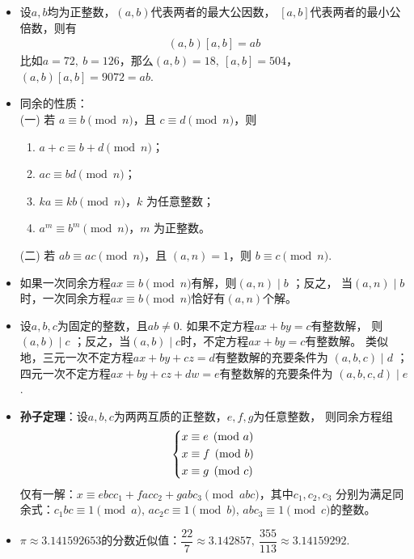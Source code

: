 \begin{itemize}[leftmargin=\inteval{\myitemleftmargin}pt,itemsep=
   \inteval{\myitemitempsep}pt,topsep=\inteval{\myitemtopsep}pt]
\item 设$a,b$均为正整数，$(a,b)$代表两者的最大公因数，
$[a,b]$代表两者的最小公倍数，则有
\begin{gather*}
    (a,b)[a,b]=ab
\end{gather*}
比如$a=72,\ b=126$，那么$(a,b)=18,\ [a,b]=504$，
$(a,b)[a,b]=9072=ab$. 

\item 同余的性质：\\
(一) 若 $ a \equiv b \pmod{n} $，且 $ c \equiv d \pmod{n} $，则
\vspace{-3mm}
\begin{enumerate}[label=(\arabic*)]
    \item $ a + c \equiv b + d \pmod{n} $； 
    \item $ ac \equiv bd \pmod{n} $；  
    \item $ ka \equiv kb \pmod{n} $，$ k $ 为任意整数；   
    \item $ a^m \equiv b^m \pmod{n} $，$ m $ 为正整数。
\end{enumerate}  
\vspace{-3mm}
(二) 若 $ ab \equiv ac \pmod{n} $，且 $ (a, n) = 1 $，则 $ b \equiv c \pmod{n} $.

\item 如果一次同余方程$ax\equiv b \pmod{n}$有解，则$(a,n)\mid b$ ；反之，
当$(a,n)\mid b$时，一次同余方程$ax\equiv b \pmod{n}$恰好有$(a,n)$个解。

\item 设$a,b,c$为固定的整数，且$ab\neq 0$. 如果不定方程$ax+by=c$有整数解，
则$(a,b)\mid c$ ；反之，当$(a,b)\mid c$时，不定方程$ax+by=c$有整数解。
类似地，三元一次不定方程$ax+by+cz=d$有整数解的充要条件为
$(a,b,c)\mid d$ ；四元一次不定方程$ax+by+cz+dw=e$有整数解的充要条件为
$(a,b,c,d)\mid e$. 

\item \textbf{孙子定理}：设$a,b,c$为两两互质的正整数，$e,f,g$为任意整数，
则同余方程组
\begin{gather*}
    \begin{dcases}
        x\equiv e \pmod{a} \\
        x\equiv f \pmod{b} \\
        x\equiv g \pmod{c} 
    \end{dcases}
\end{gather*}
仅有一解：$x\equiv ebcc_1+facc_2+gabc_3 \pmod{abc}$，其中$c_1,c_2,c_3$
分别为满足同余式：$c_1bc\equiv 1\pmod{a} $, 
$ac_2c\equiv 1\pmod{b} $, $abc_3\equiv 1\pmod{c} $的整数。

\item $ \pi\approx 3.141592653 $的分数近似值：$ \dfrac{22}{7} 
\approx 3.142857,\ \dfrac{355}{113}\approx 3.14159292 $. 


\end{itemize}
